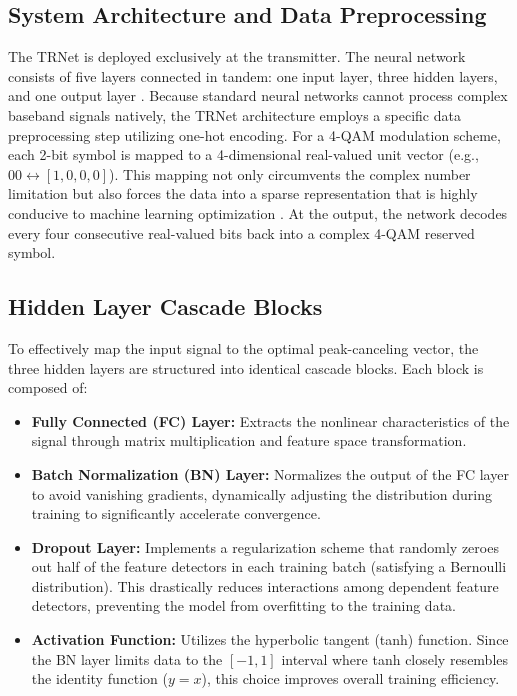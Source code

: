 \subsection{System Architecture and Data Preprocessing}
The TRNet is deployed exclusively at the transmitter. The neural network consists of five layers connected in tandem: one input layer, three hidden layers, and one output layer \cite{trnet}. Because standard neural networks cannot process complex baseband signals natively, the TRNet architecture employs a specific data preprocessing step utilizing one-hot encoding. For a 4-QAM modulation scheme, each 2-bit symbol is mapped to a 4-dimensional real-valued unit vector (e.g., $00 \leftrightarrow [1,0,0,0]$). This mapping not only circumvents the complex number limitation but also forces the data into a sparse representation that is highly conducive to machine learning optimization \cite{trnet}. At the output, the network decodes every four consecutive real-valued bits back into a complex 4-QAM reserved symbol.

\subsection{Hidden Layer Cascade Blocks}
To effectively map the input signal to the optimal peak-canceling vector, the three hidden layers are structured into identical cascade blocks. Each block is composed of:
\begin{itemize}
    \item \textbf{Fully Connected (FC) Layer:} Extracts the nonlinear characteristics of the signal through matrix multiplication and feature space transformation.
    \item \textbf{Batch Normalization (BN) Layer:} Normalizes the output of the FC layer to avoid vanishing gradients, dynamically adjusting the distribution during training to significantly accelerate convergence.
    \item \textbf{Dropout Layer:} Implements a regularization scheme that randomly zeroes out half of the feature detectors in each training batch (satisfying a Bernoulli distribution). This drastically reduces interactions among dependent feature detectors, preventing the model from overfitting to the training data.
    \item \textbf{Activation Function:} Utilizes the hyperbolic tangent (tanh) function. Since the BN layer limits data to the $[-1, 1]$ interval where tanh closely resembles the identity function ($y=x$), this choice improves overall training efficiency.
\end{itemize}

